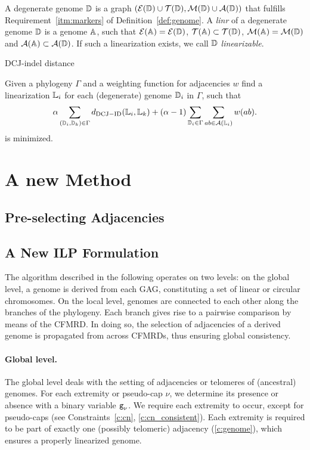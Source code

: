 \documentclass[runningheads]{llncs}
\begin{document}
A degenerate genome $\mathbb{D}$ is a graph $(\mathcal{E}(\mathbb{D})\cup\mathcal{T} (\mathbb{D}),\mathcal{M}(\mathbb{D})\cup\mathcal{A}(\mathbb{D}))$ that fulfills Requirement~\ref{itm:markers} of Definition~\ref{def:genome}. A \emph{\gls*{linr}} of a degenerate genome $\mathbb{D}$ is a genome $\mathbb{A}$, such that $\mathcal{E}(\mathbb{A})=\mathcal{E}(\mathbb{D})$, $\mathcal{T} (\mathbb{A}) \subset \mathcal{T} (\mathbb{D})$, $\mathcal{M}(\mathbb{A})=\mathcal{M}(\mathbb{D})$ and $\mathcal{A}(\mathbb{A})\subset\mathcal{A}(\mathbb{D})$. If such a linearization exists, we call $\mathbb{D}$ \emph{linearizable}.


\begin{definition}
	DCJ-indel distance
\end{definition}

\begin{definition}
	Given a phylogeny $\Gamma$ and a weighting function for adjacencies $w$ find a linearization $\mathbb{L}_i$ for each (degenerate) genome $\mathbb{D}_i$ in $\Gamma$, such that
	\begin{equation}
		\alpha \sum_{(\mathbb{D}_i,\mathbb{D}_k)\in \Gamma} d_{\mathrm{DCJ-ID}} (\mathbb{L}_i,\mathbb{L}_k) + (\alpha -1) \sum_{\mathbb{D}_i\in \Gamma}\sum_{ab\in\mathcal{A}(\mathbb{L}_i)}w(ab).
	\end{equation}
	is minimized.
\end{definition}
\section{A new Method}
\subsection{Pre-selecting Adjacencies}
\subsection{A New ILP Formulation}



The algorithm described in the following operates on two levels: 
on the global level, a genome is derived from each GAG, constituting a set of linear or circular chromosomes. 
On the local level, genomes are connected to each other along the branches of the phylogeny. Each branch gives rise to a pairwise comparison by means of the CFMRD. 
In doing so, the selection of adjacencies of a derived genome is propagated from across CFMRDs, thus ensuring global consistency. 

\paragraph{Global level.} 
The global level deals with the setting of adjacencies or telomeres of (ancestral) genomes. For each extremity or pseudo-cap $\nu$, we determine its presence or absence with a binary variable ${\texttt{g}}_\nu$. We require each extremity to occur, except for pseudo-caps (see Constraints~\ref{c:cn}, \ref{c:cn_consistent}). Each extremity is required to be part of exactly one (possibly telomeric) adjacency (\ref{c:genome}), which ensures a properly linearized genome.
\end{document}
